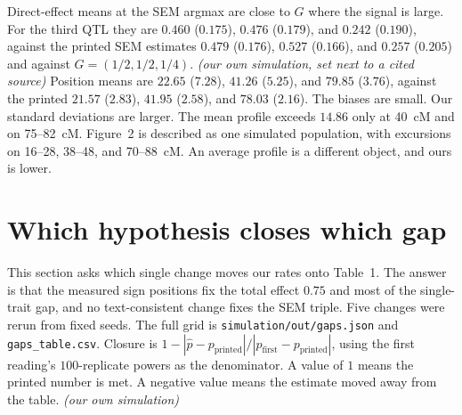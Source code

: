 \documentclass[11pt]{article}
\newcommand{\ev}[1]{\textup{\emph{(#1)}}}
\begin{document}
Direct-effect means at the SEM argmax are close to $G$ where the signal is
large. For the third QTL they are $0.460$ ($0.175$), $0.476$ ($0.179$), and
$0.242$ ($0.190$), against the printed SEM estimates $0.479$ ($0.176$),
$0.527$ ($0.166$), and $0.257$ ($0.205$) and against $G=(1/2,1/2,1/4)$.
\ev{our own simulation, set next to a cited source}
Position means are $22.65$ ($7.28$), $41.26$ ($5.25$), and $79.85$ ($3.76$),
against the printed $21.57$ ($2.83$), $41.95$ ($2.58$), and $78.03$ ($2.16$).
The biases are small. Our standard deviations are larger. The mean profile
exceeds $14.86$ only at 40~cM and on 75--82~cM. Figure~2 is described as one
simulated population, with excursions on 16--28, 38--48, and 70--88~cM. An
average profile is a different object, and ours is lower.

\section{Which hypothesis closes which gap}
\label{sec:gaps}

This section asks which single change moves our rates onto Table~1. The
answer is that the measured sign positions fix the total effect $0.75$ and
most of the single-trait gap, and no text-consistent change fixes the SEM
triple. Five changes were rerun from fixed seeds. The full grid is
\texttt{simulation/out/gaps.json} and \texttt{gaps\_table.csv}. Closure is
$1-|\hat p-p_{\mathrm{printed}}|/|p_{\mathrm{first}}-p_{\mathrm{printed}}|$,
using the first reading's $100$-replicate powers as the denominator. A value
of $1$ means the printed number is met. A negative value means the estimate
moved away from the table. \ev{our own simulation}
\end{document}
